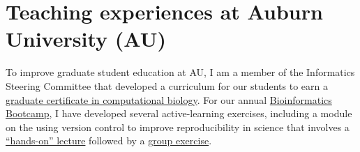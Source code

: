 
\section*{Teaching experiences at Auburn University (AU)}
To improve graduate student education at AU,
I am a member of the Informatics Steering Committee that developed a
curriculum for our students to earn a
\href{http://bulletin.auburn.edu/thegraduateschool/graduatedegreesoffered/biologicalsciencesmsphd_major/computationalbiology_gradcert/}{graduate certificate in computational biology}.
For our annual
\href{http://www.auburn.edu/cosam/bioinformatics/}{Bioinformatics Bootcamp},
I have developed several active-learning exercises,
including a module on the using version control to improve reproducibility in
science that involves a
\href{http://phyletica.org/slides/git-intro/}{``hands-on'' lecture}
followed by a
\href{https://github.com/joaks1/au-bootcamp-git-intro}{group exercise}.

